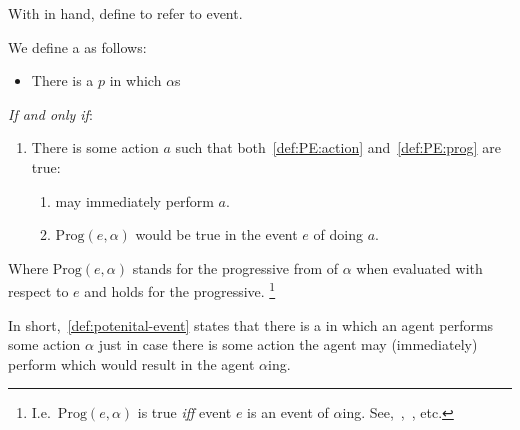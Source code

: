 \begin{note}
  With \assuPP{} in hand, define \pevent{} to refer to event.

  We define a \pevent{} as follows:
  \begin{definition}[\pevent{3}]
    \label{def:potenital-event}

    \begin{itemize}
    \item
      There is a \pevent{} \(p\) in which \vAgent{} \(\alpha\)s
    \end{itemize}

    \emph{If and only if}:

    \begin{enumerate}[label=]
    \item
      There is some action \(a\) such that both~\ref{def:PE:action} and~\ref{def:PE:prog} are true:
      \begin{enumerate}[label=\alph*., ref=(\alph*)]
      \item
        \label{def:PE:action}
        \vAgent{} may immediately perform \(a\).
      \item
        \label{def:PE:prog}
        \(\text{Prog}(e, \alpha)\) would be true in the event \(e\) of \vAgent{} doing \(a\).
      \end{enumerate}
    \end{enumerate}

    Where \(\text{Prog}(e, \alpha)\) stands for the progressive from of \(\alpha\) when evaluated with respect to \(e\) and \assuPP{} holds for the progressive.%
    \footnote{
      I.e.\ \(\text{Prog}(e, \alpha)\) is true \emph{iff} event \(e\) is an event of \(\alpha\)ing.
      See,~\textcite{Richards:1981wo},~\textcite{Portner:2011vi}, etc.
    }
  \end{definition}

  In short,~\autoref{def:potenital-event} states that there is a \pevent{} in which an agent performs some action \(\alpha\) just in case there is some action the agent may (immediately) perform which would result in the agent \(\alpha\)ing.
\end{note}

